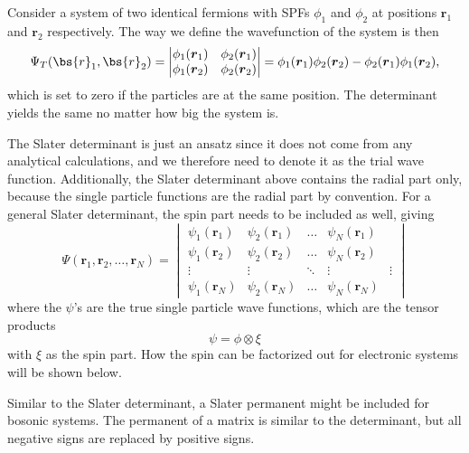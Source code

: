 Consider a system of two identical fermions with SPFs $\phi_1$ and $\phi_2$ at positions $\boldsymbol{r}_1$ and $\boldsymbol{r}_2$ respectively. The way we define the wavefunction of the system is then
\begin{equation}
\Psi_T(\bs{r}_1,\bs{r}_2)=
\begin{vmatrix}
\phi_1(\boldsymbol{r}_1) & \phi_2(\boldsymbol{r}_1)\\
\phi_1(\boldsymbol{r}_2) & \phi_2(\boldsymbol{r}_2)
\end{vmatrix}
=\phi_1(\boldsymbol{r}_1)\phi_2(\boldsymbol{r}_2)-\phi_2(\boldsymbol{r}_1)\phi_1(\boldsymbol{r}_2),
\end{equation}
which is set to zero if the particles are at the same position. The determinant yields the same no matter how big the system is.

The Slater determinant is just an ansatz since it does not come from any analytical calculations, and we therefore need to denote it as the trial wave function. Additionally, the Slater determinant above contains the radial part only, because the single particle functions are the radial part by convention. For a general Slater determinant, the spin part needs to be included as well, giving 
\begin{equation}
\Psi(\boldsymbol{r}_1,\boldsymbol{r}_2,\hdots,\boldsymbol{r}_N)=
\begin{vmatrix}
\psi_1(\boldsymbol{r}_1) & \psi_2(\boldsymbol{r}_1) & \hdots & \psi_N(\boldsymbol{r}_1)\\
\psi_1(\boldsymbol{r}_2) & \psi_2(\boldsymbol{r}_2) & \hdots & \psi_N(\boldsymbol{r}_2)\\
\vdots & \vdots & \ddots & \vdots & \vdots\\
\psi_1(\boldsymbol{r}_N) & \psi_2(\boldsymbol{r}_N) & \hdots & \psi_N(\boldsymbol{r}_N)
\end{vmatrix}
\end{equation}
where the $\psi$'s are the true single particle wave functions, which are the tensor products 
\begin{equation}
\psi=\phi\otimes\xi
\end{equation}
with $\xi$ as the spin part. How the spin can be factorized out for electronic systems will be shown below. 

Similar to the Slater determinant, a Slater permanent might be included for bosonic systems. The permanent of a matrix is similar to the determinant, but all negative signs are replaced by positive signs. 

